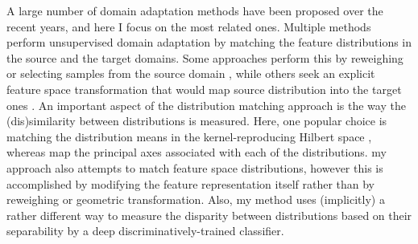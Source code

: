 \documentclass{iitthesis}
\begin{document}

A large number of domain adaptation methods have been proposed over the recent years, and here I focus on the most related ones. Multiple methods perform unsupervised domain adaptation by matching the feature distributions in the source and the target domains. Some approaches perform this by reweighing or selecting samples from the source domain \cite{borgwardt2006integrating} \cite{huang2006correcting} \cite{gong2013connecting}, while others seek an explicit feature space transformation that would map source distribution into the target ones \cite{pan2011domain} \cite{gopalan2011domain} \cite{baktashmotlagh2013unsupervised}. An important aspect of the distribution matching approach is the way the (dis)similarity between distributions is measured. Here, one popular choice is matching the distribution means in the kernel-reproducing Hilbert space \cite{borgwardt2006integrating} \cite{huang2006correcting}, whereas \cite{gong2012geodesic} \cite{fernando2013unsupervised} map the principal axes associated with each of the distributions. my approach also attempts to match feature space distributions, however this is accomplished by modifying the feature representation itself rather than by reweighing or geometric transformation. Also, my method uses (implicitly) a rather different way to measure the disparity between distributions based on their separability by a deep discriminatively-trained classifier.
\end{document}
